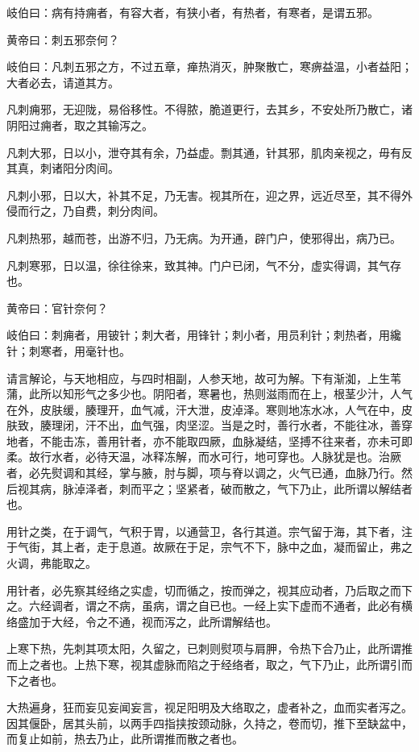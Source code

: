 \documentclass[a4paper,12pt,UTF8,twoside]{ctexbook}
\begin{document}
	岐伯曰：病有持痈者，有容大者，有狭小者，有热者，有寒者，是谓五邪。
	
	黄帝曰：刺五邪奈何？
	
	岐伯曰：凡刺五邪之方，不过五章，瘅热消灭，肿聚散亡，寒痹益温，小者益阳；大者必去，请道其方。
	
	凡刺痈邪，无迎陇，易俗移性。不得脓，脆道更行，去其乡，不安处所乃散亡，诸阴阳过痈者，取之其输泻之。
	
	凡刺大邪，日以小，泄夺其有余，乃益虚。剽其通，针其邪，肌肉亲视之，毋有反其真，刺诸阳分肉间。
	
	凡刺小邪，日以大，补其不足，乃无害。视其所在，迎之界，远近尽至，其不得外侵而行之，乃自费，刺分肉间。
	
	凡刺热邪，越而苍，出游不归，乃无病。为开通，辟门户，使邪得出，病乃已。
	
	凡刺寒邪，日以温，徐往徐来，致其神。门户已闭，气不分，虚实得调，其气存也。
	
	黄帝曰：官针奈何？
	
	岐伯曰：刺痈者，用铍针；刺大者，用锋针；刺小者，用员利针；刺热者，用纔针；刺寒者，用毫针也。
	
	请言解论，与天地相应，与四时相副，人参天地，故可为解。下有渐洳，上生苇蒲，此所以知形气之多少也。阴阳者，寒暑也，热则滋雨而在上，根茎少汁，人气在外，皮肤缓，腠理开，血气减，汗大泄，皮淖泽。寒则地冻水冰，人气在中，皮肤致，腠理闭，汗不出，血气强，肉坚涩。当是之时，善行水者，不能往冰，善穿地者，不能击冻，善用针者，亦不能取四厥，血脉凝结，坚搏不往来者，亦未可即柔。故行水者，必待天温，冰释冻解，而水可行，地可穿也。人脉犹是也。治厥者，必先熨调和其经，掌与腋，肘与脚，项与脊以调之，火气已通，血脉乃行。然后视其病，脉淖泽者，刺而平之；坚紧者，破而散之，气下乃止，此所谓以解结者也。
	
	用针之类，在于调气，气积于胃，以通营卫，各行其道。宗气留于海，其下者，注于气街，其上者，走于息道。故厥在于足，宗气不下，脉中之血，凝而留止，弗之火调，弗能取之。
	
	用针者，必先察其经络之实虚，切而循之，按而弹之，视其应动者，乃后取之而下之。六经调者，谓之不病，虽病，谓之自已也。一经上实下虚而不通者，此必有横络盛加于大经，令之不通，视而泻之，此所谓解结也。
	
	上寒下热，先刺其项太阳，久留之，已刺则熨项与肩胛，令热下合乃止，此所谓推而上之者也。上热下寒，视其虚脉而陷之于经络者，取之，气下乃止，此所谓引而下之者也。
	
	大热遍身，狂而妄见妄闻妄言，视足阳明及大络取之，虚者补之，血而实者泻之。因其偃卧，居其头前，以两手四指挟按颈动脉，久持之，卷而切，推下至缺盆中，而复止如前，热去乃止，此所谓推而散之者也。
	
\end{document}
